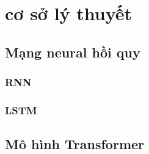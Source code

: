 \chapter{cơ sở lý thuyết}

\section{Mạng neural hồi quy}
\subsection{RNN}
\subsection{LSTM}

\section{Mô hình Transformer}